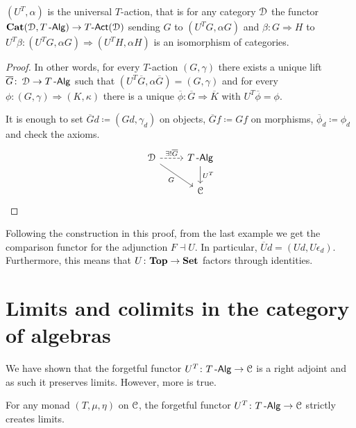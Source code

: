 \documentclass[a4paper,11pt,oneside,openany]{scrbook}
\begin{document}
\begin{prop}
	$(U^T,\alpha)$ is the universal $T$-action, that is for any category $\operatorname{\mathcal{D}}$ the functor ${\normalfont\textbf{Cat}}(\operatorname{\mathcal{D}},T\operatorname{-\mathsf{Alg}})\rightarrow T\mbox{-}\mathsf{Act}(\operatorname{\mathcal{D}})$ sending $G$ to $(U^TG,\alpha G)$ and $\beta\colon G\Rightarrow H$ to $U^T\beta\colon(U^TG,\alpha G)\Rightarrow (U^TH,\alpha H)$ is an isomorphism of categories.
\end{prop}

\begin{proof}
	In other words, for every $T$-action $(G,\gamma)$ there exists a unique lift $\overline{G}\colon\operatorname{\mathcal{D}}\rightarrow T\operatorname{-\mathsf{Alg}}$ such that $(U^T\overline{G},\alpha\overline{G})=(G,\gamma)$ and for every $\phi\colon(G,\gamma)\Rightarrow (K,\kappa)$ there is a unique $\overline{\phi}\colon\overline{G}\Rightarrow\overline{K}$ with $U^T\overline{\phi}=\phi$.
	
	It is enough to set $\overline{G}d\coloneqq(Gd,\gamma_d)$ on objects, $\overline{G}f\coloneqq Gf$ on morphisms, $\overline{\phi}_d\coloneqq\phi_d$ and check the axioms.
	\[
		\begin{tikzcd}
			\D\ar[r, dashed, "\exists!\overline{G}"]\ar[dr, swap, "G"]
			& T\Alg\ar[d, "U^T"] \\
			& \C                  
		\end{tikzcd}    
	\]			
\end{proof}

Following the construction in this proof, from the last example we get the comparison functor for the adjunction $F\dashv U$. In particular, $\overline{U}d=(Ud,U\epsilon_d)$. Furthermore, this means that $U\colon{\normalfont\textbf{Top}}\rightarrow{\normalfont\textbf{Set}}$ factors through identities.


\section{Limits and colimits in the category of algebras}

We have shown that the forgetful functor $U^T\colon T\operatorname{-\mathsf{Alg}}\rightarrow\operatorname{\mathcal{C}}$ is a right adjoint and as such it preserves limits. However, more is true.

\begin{prop}\label{create lims}
	For any monad $(T,\mu,\eta)$ on $\operatorname{\mathcal{C}}$, the forgetful functor $U^T\colon T\operatorname{-\mathsf{Alg}}\rightarrow\operatorname{\mathcal{C}}$ strictly creates limits.
\end{prop}
\end{document}
